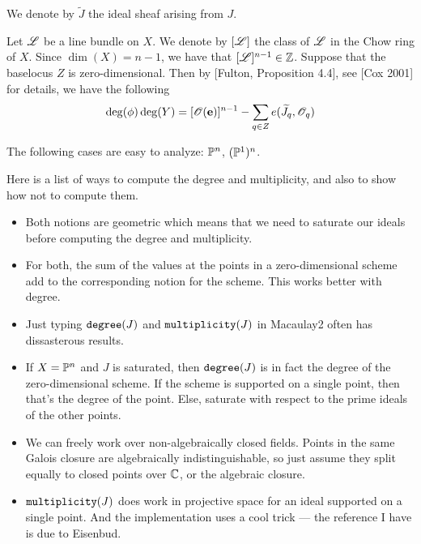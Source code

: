\documentclass[fleqn,reqno]{amsart}
\numberwithin{first}{chapter}
\begin{document}
\begin{paragraf}
We denote by $\widetilde{J}$ the ideal sheaf arising from $J$.
\end{paragraf}

\begin{paragraf}
Let $\mathscr{L}$ be a line bundle on $X$.
We denote by $[\mathscr{L}]$ the class of $\mathscr{L}$ in the Chow ring of $X$.
Since $\dim(X)=n-1$, we have that $[\mathscr{L}]^{n-1}\in\mathbb{Z}$.
Suppose that the baselocus $Z$ is zero-dimensional.
Then by [Fulton, Proposition 4.4], see [Cox 2001] for details,
we have the following
\begin{align}
	\label{eq:degree-formula}
	\deg(\phi)\deg(Y)=[\mathscr{O}(\mathbf e)]^{n-1}-\sum_{q\in Z}e(\widetilde{J}_q,\mathscr{O}_q)
\end{align}
\end{paragraf}

\begin{example}
The following cases are easy to analyze: $\mathbb{P}^n$, $(\mathbb{P}^1)^n$.
\end{example}

\begin{example}
Here is a list of ways to compute the degree and multiplicity, and also
to show how not to compute them.
\begin{itemize}
	\item Both notions are geometric which means that we need to saturate our ideals
	before computing the degree and multiplicity.
	\item For both, the sum of the values at the points in a zero-dimensional scheme
	add to the corresponding notion for the scheme.
	This works better with degree.
	\item Just typing $\mathop{\tt degree}(J)$ and $\mathop{\tt multiplicity}(J)$ in Macaulay2 often
	has dissasterous results.
	\item If $X=\mathbb{P}^n$ and $J$ is saturated, then $\mathop{\tt degree}(J)$ is in fact the degree
	of the zero-dimensional scheme.
	If the scheme is supported on a single point, then that's the degree of the point.
	Else, saturate with respect to the prime ideals of the other points.
	\item We can freely work over non-algebraically closed fields.
	Points in the same Galois closure are algebraically indistinguishable,
	so just assume they split equally to closed points over $\mathbb{C}$, or the algebraic closure.
	\item $\mathop{\tt multiplicity}(J)$ does work in projective space for an ideal supported
	on a single point.
	And the implementation uses a cool trick --- the reference I have is due to Eisenbud.
\end{itemize}
\end{example}
\end{document}
